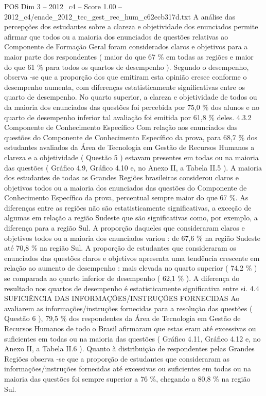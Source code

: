 \begin{textsample}{POS Dim 3 – 2012\_c4 – Score 1.00 – 2012\_c4/enade\_2012\_tec\_gest\_rec\_hum\_c62ecb317d.txt}
A análise das percepções dos estudantes sobre a clareza e objetividade dos enunciados permite afirmar que todos ou a maioria dos enunciados de questões relativas ao Componente de Formação Geral foram considerados claros e objetivos para a maior parte dos respondentes ( maior do que 67 \% em todas as regiões e maior do que 61 \% para todos os quartos de desempenho ).
Segundo o desempenho, observa -se que a proporção dos que emitiram esta opinião cresce conforme o desempenho aumenta, com diferenças estatisticamente significativas entre os quarto de desempenho.
No quarto superior, a clareza e objetividade de todos ou da maioria dos enunciados das questões foi percebida por 75,0 \% dos alunos e no quarto de desempenho inferior tal avaliação foi emitida por 61,8 \% deles. 4.3.2 Componente de Conhecimento Específico Com relação aos enunciados das questões do Componente de Conhecimento Específico da prova, para 68,7 \% dos estudantes avaliados da Área de Tecnologia em Gestão de Recursos Humanos a clareza e a objetividade ( Questão 5 ) estavam presentes em todas ou na maioria das questões ( Gráfico 4.9, Gráfico 4.10 e, no Anexo II, a Tabela II.5 ).
A maioria dos estudantes de todas as Grandes Regiões brasileiras considerou claros e objetivos todos ou a maioria dos enunciados das questões do Componente de Conhecimento Específico da prova, percentual sempre maior do que 67 \%.
As diferenças entre as regiões não são estatisticamente significativas, a exceção de algumas em relação a região Sudeste que são significativas como, por exemplo, a diferença para a região Sul.
A proporção daqueles que consideraram claros e objetivos todos ou a maioria dos enunciados variou : de 67,6 \% na região Sudeste até 70,8 \% na região Sul.
A proporção de estudantes que consideraram os enunciados das questões claros e objetivos apresenta uma tendência crescente em relação ao aumento de desempenho : mais elevada no quarto superior ( 74,2 \% ) se comparada ao quarto inferior de desempenho ( 62,1 \% ).
A diferença do resultado nos quartos de desempenho é estatisticamente significativa entre si. 4.4 SUFICIÊNCIA DAS INFORMAÇÕES/INSTRUÇÕES FORNECIDAS Ao avaliarem as informações/instruções fornecidas para a resolução das questões ( Questão 6 ), 79,5 \% dos respondentes da Área de Tecnologia em Gestão de Recursos Humanos de todo o Brasil afirmaram que estas eram até excessivas ou suficientes em todas ou na maioria das questões ( Gráfico 4.11, Gráfico 4.12 e, no Anexo II, a Tabela II.6 ).
Quanto à distribuição de respondentes pelas Grandes Regiões observa -se que a proporção de estudantes que consideraram as informações/instruções fornecidas até excessivas ou suficientes em todas ou na maioria das questões foi sempre superior a 76 \%, chegando a 80,8 \% na região Sul.

\end{textsample}
